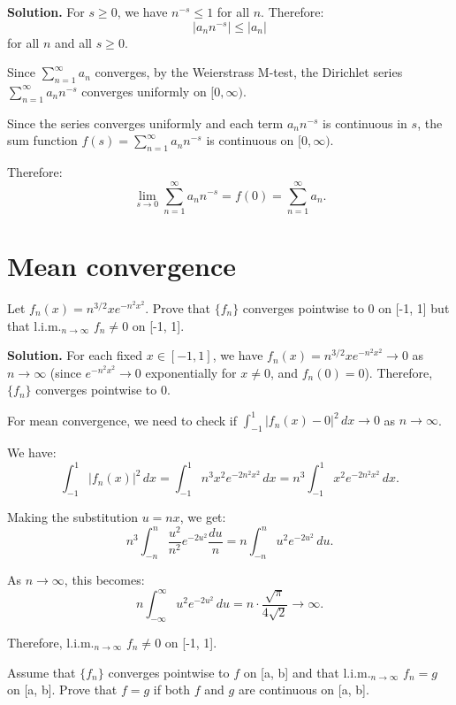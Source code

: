 \noindent\textbf{Solution.} For \( s \geq 0 \), we have \( n^{-s} \leq 1 \) for all \( n \). Therefore:
\[|a_n n^{-s}| \leq |a_n|\]
for all \( n \) and all \( s \geq 0 \).

Since \( \sum_{n=1}^{\infty} a_n \) converges, by the Weierstrass M-test, the Dirichlet series \( \sum_{n=1}^{\infty} a_n n^{-s} \) converges uniformly on \( [0, \infty) \).

Since the series converges uniformly and each term \( a_n n^{-s} \) is continuous in \( s \), the sum function \( f(s) = \sum_{n=1}^{\infty} a_n n^{-s} \) is continuous on \( [0, \infty) \).

Therefore:
\[\lim_{s \to 0} \sum_{n=1}^{\infty} a_n n^{-s} = f(0) = \sum_{n=1}^{\infty} a_n.\]

\section{Mean convergence}

\begin{problembox}
Let \( f_n(x) = n^{3/2}xe^{-n^2x^2} \). Prove that \( \{f_n\} \) converges pointwise to 0 on [-1, 1] but that l.i.m.\(_{n\to\infty}\) \( f_n \neq 0 \) on [-1, 1].
\end{problembox}

\noindent\textbf{Solution.} For each fixed \( x \in [-1, 1] \), we have \( f_n(x) = n^{3/2}xe^{-n^2x^2} \to 0 \) as \( n \to \infty \) (since \( e^{-n^2x^2} \to 0 \) exponentially for \( x \neq 0 \), and \( f_n(0) = 0 \)). Therefore, \( \{f_n\} \) converges pointwise to 0.

For mean convergence, we need to check if \( \int_{-1}^1 |f_n(x) - 0|^2 \, dx \to 0 \) as \( n \to \infty \).

We have:
\[\int_{-1}^1 |f_n(x)|^2 \, dx = \int_{-1}^1 n^3 x^2 e^{-2n^2x^2} \, dx = n^3 \int_{-1}^1 x^2 e^{-2n^2x^2} \, dx.\]

Making the substitution \( u = nx \), we get:
\[n^3 \int_{-n}^n \frac{u^2}{n^2} e^{-2u^2} \frac{du}{n} = n \int_{-n}^n u^2 e^{-2u^2} \, du.\]

As \( n \to \infty \), this becomes:
\[n \int_{-\infty}^{\infty} u^2 e^{-2u^2} \, du = n \cdot \frac{\sqrt{\pi}}{4\sqrt{2}} \to \infty.\]

Therefore, l.i.m.\(_{n\to\infty}\) \( f_n \neq 0 \) on [-1, 1].

\begin{problembox}
Assume that \( \{f_n\} \) converges pointwise to \( f \) on [a, b] and that l.i.m.\(_{n\to\infty}\) \( f_n = g \) on [a, b]. Prove that \( f = g \) if both \( f \) and \( g \) are continuous on [a, b].
\end{problembox}

